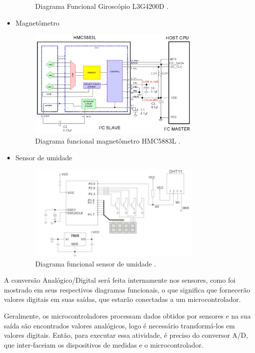 \begin{itemize}
\begin{figure}[H]
    \caption{Diagrama Funcional Giroscópio L3G4200D \cite{giroscopio}.}
    \label{img:giroscopio}
  \end{figure}
  \item Magnetômetro
  \begin{figure}[H]
    \centering
    \includegraphics[width=0.8\textwidth]{figuras/6}
    \caption{Diagrama funcional magnetômetro HMC5883L \cite{magnetometro}.}
    \label{img:magnetometro}
  \end{figure}
  \item Sensor de umidade
  \begin{figure}[H]
    \centering
    \includegraphics[width=0.8\textwidth]{figuras/5}
    \caption{Diagrama funcional sensor de umidade \cite{sensorhumidade}.}
    \label{img:sensorumidade}
  \end{figure}
\end{itemize}

A conversão Analógico/Digital será feita internamente nos sensores, como foi mostrado em seus respectivos diagramas funcionais, o que significa que fornecerão valores digitais em suas saídas, que estarão conectadas a um microcontrolador.

Geralmente, os microcontroladores processam dados obtidos por sensores e na sua saída são encontrados valores analógicos, logo é necessário transformá-los em valores digitais. Então, para executar essa atividade, é preciso do conversor A/D, que inter-faceiam os dispositivos de medidas e o microcontrolador.

